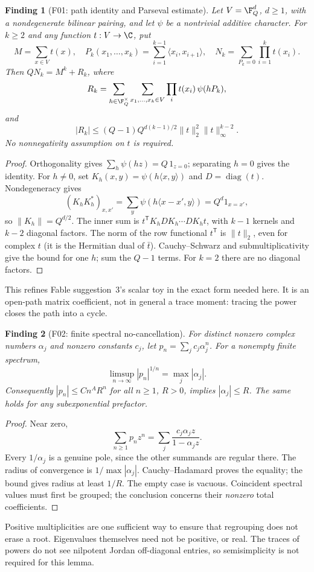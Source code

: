 \documentclass[11pt,a4paper]{article}
\newcommand{\fid}[1]{\textsf{#1}}\newcommand{\gate}[1]{\textsf{#1}}
\theoremstyle{named}\newtheorem{finding}{Finding}[section]
\theoremstyle{definition}\newtheorem{definition}[finding]{Definition}
\theoremstyle{remark}\newtheorem{remark}[finding]{Remark}
\begin{document}
\begin{finding}[\fid{F01}: path identity and Parseval estimate]\label{f:path}
Let $V=\F_Q^d$, $d\ge1$, with a nondegenerate bilinear pairing, and let $\psi$ be a nontrivial additive character. For $k\ge2$ and any function $t:V\to\C$, put
\[
 M=\sum_{x\in V}t(x),\quad
 P_k(x_1,\ldots,x_k)=\sum_{i=1}^{k-1}\langle x_i,x_{i+1}\rangle,
 \quad N_k=\sum_{P_k=0}\prod_{i=1}^k t(x_i).
\]
Then $QN_k=M^k+R_k$, where
\[
 R_k=\sum_{h\in\F_Q^\times}\sum_{x_1,\ldots,x_k\in V}
       \prod_i t(x_i)\,\psi(hP_k),
\]
and
\begin{equation}\label{eq:parseval}
 |R_k|\le (Q-1)Q^{d(k-1)/2}\|t\|_2^2\|t\|_\infty^{k-2}.
\end{equation}
No nonnegativity assumption on $t$ is required.
\end{finding}
\begin{proof}
Orthogonality gives $\sum_h\psi(hz)=Q\,1_{z=0}$; separating $h=0$ gives the identity. For $h\ne0$, set $K_h(x,y)=\psi(h\langle x,y\rangle)$ and $D=\operatorname{diag}(t)$. Nondegeneracy gives
\[
 (K_hK_h^*)_{x,x'}=\sum_y\psi(h\langle x-x',y\rangle)
 =Q^d1_{x=x'},
\]
so $\|K_h\|=Q^{d/2}$. The inner sum is
$t^{\mathsf T}K_hD K_h\cdots D K_ht$, with $k-1$ kernels and $k-2$ diagonal factors. The norm of the row functional $t^{\mathsf T}$ is $\|t\|_2$, even for complex $t$ (it is the Hermitian dual of $\bar t$). Cauchy--Schwarz and submultiplicativity give the bound for one $h$; sum the $Q-1$ terms. For $k=2$ there are no diagonal factors.
\end{proof}
This refines Fable suggestion~3's scalar toy in the exact form needed here. It is an open-path matrix coefficient, not in general a trace moment: tracing the power closes the path into a cycle.

\begin{finding}[\fid{F02}: finite spectral no-cancellation]\label{f:spectral}
For distinct nonzero complex numbers $\alpha_j$ and nonzero constants $c_j$, let $p_n=\sum_jc_j\alpha_j^n$. For a nonempty finite spectrum,
\[
 \limsup_{n\to\infty}|p_n|^{1/n}=\max_j|\alpha_j|.
\]
Consequently $|p_n|\le Cn^A R^n$ for all $n\ge1$, $R>0$, implies $|\alpha_j|\le R$. The same holds for any subexponential prefactor.
\end{finding}
\begin{proof}
Near zero,
\[
 \sum_{n\ge1}p_nz^n=\sum_j\frac{c_j\alpha_jz}{1-\alpha_jz}.
\]
Every $1/\alpha_j$ is a genuine pole, since the other summands are regular there. The radius of convergence is $1/\max|\alpha_j|$. Cauchy--Hadamard proves the equality; the bound gives radius at least $1/R$. The empty case is vacuous. Coincident spectral values must first be grouped; the conclusion concerns their \emph{nonzero} total coefficients.
\end{proof}
Positive multiplicities are one sufficient way to ensure that regrouping does not erase a root. Eigenvalues themselves need not be positive, or real. The traces of powers do not see nilpotent Jordan off-diagonal entries, so semisimplicity is not required for this lemma.
\end{document}
